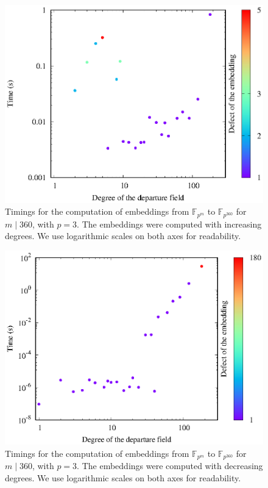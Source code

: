 \begin{figure}
  \centering
  \includegraphics{benchmarks/lattice-bcs/embed-to-360-up-3.eps}
  \caption{Timings for the computation of embeddings from $\mathbb{F}_{p^{m}}$
  to $\mathbb{F}_{p^{360}}$ for $m\mid 360$, with $p=3$. The
  embeddings were computed with increasing degrees. We use logarithmic scales on
  both axes for readability.}
  \label{fig:bcs-embed-to-360-up}
\end{figure}
\begin{figure}
  \centering
  \includegraphics{benchmarks/lattice-bcs/embed-to-360-down-3.eps}
  \caption{Timings for the computation of embeddings from $\mathbb{F}_{p^{m}}$
  to $\mathbb{F}_{p^{360}}$ for $m\mid 360$, with $p=3$. The
  embeddings were computed with decreasing degrees. We use logarithmic scales on
  both axes for readability.}
  \label{fig:bcs-embed-to-360-down}
\end{figure}
